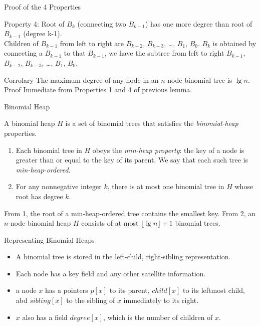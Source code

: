 \documentclass{beamer}
\begin{document}
\begin{frame}{}
\centerline{\large Proof of the 4 Properties}
Property 4: Root of $B_k$ (connecting two $B_{k-1}$) has one more degree than root of $B_{k-1}$ (degree k-1). \\
Children of $B_{k-1}$ from left to right are $B_{k-2}$, $B_{k-3}$, \ldots, $B_1$, $B_0$.  
$B_k$ is obtained by connecting a $B_{k-1}$ to that $B_{k-1}$, we have the subtree from left to right
 $B_{k-1}$, $B_{k-2}$, $B_{k-3}$, \ldots, $B_1$, $B_0$. 
\end {frame}

\begin{frame}{}
{ Corrolary } The maximum degree of any node in an $n$-node binomial tree is $\lg n$.\\
{ Proof } Immediate from Properties 1 and 4 of previous lemma. 
\end{frame}

\begin{frame}{}
\centerline{\large Binomial Heap}
\vspace{0.5cm}
A binomial heap $H$ is a set of binomial trees that satisfies the {\it binomial-heap} properties. 
\begin{enumerate}
\item Each binomial tree in $H$ obeys the {\it min-heap property}: the key of a node is greater than
 or equal to the key of its parent. We say that each such tree is {\it min-heap-ordered}. 
\item For any nonnegative integer $k$, there is at most one binomial tree in $H$ whose root has degree $k$. 
\end{enumerate}
From 1, the root of a min-heap-ordered tree contains the smallest key. From 2, an $n$-node binomial heap $H$
consists of at most $\lfloor \lg n\rfloor +1$ binomial trees. 
\end{frame}

\begin{frame}{}
\centerline{\large Representing Binomial Heaps} 
\vspace {0.5cm}
\begin{itemize}
\item A binomial tree is stored in the left-child, right-sibling representation.
\item Each node has a key field and any other satellite information.
\item a node $x$ has a pointers $p[x]$ to its parent, $child[x]$ to its leftmost child, abd $sibling[x]$
 to the sibling of $x$ immediately to its right. 
\item $x$ also has a field $degree[x]$, which is the number of children of $x$. 
\end{itemize}
\end{frame}
\end{document}
